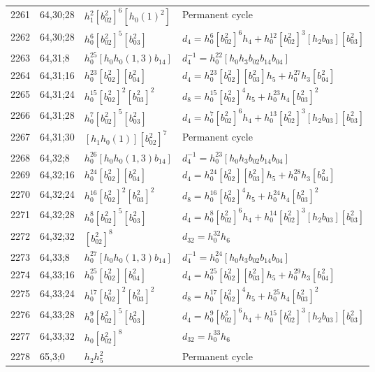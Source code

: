 \documentclass{article}
\begin{document}
\begin{longtable}{|l|l|>{\raggedright\arraybackslash}p{6cm}|>{\raggedright\arraybackslash}p{6cm}|}
\hline
2261 & 64,30;28 & $h_1^2[b_{02}^2]^6[h_0(1)^2]$ & Permanent cycle\\
2262 & 64,30;28 & $h_0^6[b_{02}^2]^5[b_{03}^2]$ &$d_{4}=h_0^6[b_{02}^2]^6h_4 + h_0^{12}[b_{02}^2]^3[h_2b_{03}][b_{03}^2]$\\
\hline
2263 & 64,31;8 & $h_0^{25}[h_0h_0(1, 3)b_{14}]$ & $d_{4}^{-1}=h_0^{22}[h_0h_3b_{02}b_{14}b_{04}]$\\
\hline
2264 & 64,31;16 & $h_0^{23}[b_{02}^2][b_{04}^2]$ &$d_{4}=h_0^{23}[b_{02}^2][b_{03}^2]h_5 + h_0^{27}h_3[b_{04}^2]$\\
\hline
2265 & 64,31;24 & $h_0^{15}[b_{02}^2]^2[b_{03}^2]^2$ &$d_{8}=h_0^{15}[b_{02}^2]^4h_5 + h_0^{23}h_4[b_{03}^2]^2$\\
\hline
2266 & 64,31;28 & $h_0^7[b_{02}^2]^5[b_{03}^2]$ &$d_{4}=h_0^7[b_{02}^2]^6h_4 + h_0^{13}[b_{02}^2]^3[h_2b_{03}][b_{03}^2]$\\
\hline
2267 & 64,31;30 & $[h_1h_0(1)][b_{02}^2]^7$ & Permanent cycle\\
\hline
2268 & 64,32;8 & $h_0^{26}[h_0h_0(1, 3)b_{14}]$ & $d_{4}^{-1}=h_0^{23}[h_0h_3b_{02}b_{14}b_{04}]$\\
\hline
2269 & 64,32;16 & $h_0^{24}[b_{02}^2][b_{04}^2]$ &$d_{4}=h_0^{24}[b_{02}^2][b_{03}^2]h_5 + h_0^{28}h_3[b_{04}^2]$\\
\hline
2270 & 64,32;24 & $h_0^{16}[b_{02}^2]^2[b_{03}^2]^2$ &$d_{8}=h_0^{16}[b_{02}^2]^4h_5 + h_0^{24}h_4[b_{03}^2]^2$\\
\hline
2271 & 64,32;28 & $h_0^8[b_{02}^2]^5[b_{03}^2]$ &$d_{4}=h_0^8[b_{02}^2]^6h_4 + h_0^{14}[b_{02}^2]^3[h_2b_{03}][b_{03}^2]$\\
\hline
2272 & 64,32;32 & $[b_{02}^2]^8$ &$d_{32}=h_0^{32}h_6$\\
\hline
2273 & 64,33;8 & $h_0^{27}[h_0h_0(1, 3)b_{14}]$ & $d_{4}^{-1}=h_0^{24}[h_0h_3b_{02}b_{14}b_{04}]$\\
\hline
2274 & 64,33;16 & $h_0^{25}[b_{02}^2][b_{04}^2]$ &$d_{4}=h_0^{25}[b_{02}^2][b_{03}^2]h_5 + h_0^{29}h_3[b_{04}^2]$\\
\hline
2275 & 64,33;24 & $h_0^{17}[b_{02}^2]^2[b_{03}^2]^2$ &$d_{8}=h_0^{17}[b_{02}^2]^4h_5 + h_0^{25}h_4[b_{03}^2]^2$\\
\hline
2276 & 64,33;28 & $h_0^9[b_{02}^2]^5[b_{03}^2]$ &$d_{4}=h_0^9[b_{02}^2]^6h_4 + h_0^{15}[b_{02}^2]^3[h_2b_{03}][b_{03}^2]$\\
\hline
2277 & 64,33;32 & $h_0[b_{02}^2]^8$ &$d_{32}=h_0^{33}h_6$\\
\hline
2278 & 65,3;0 & $h_2h_5^2$ & Permanent cycle\\

\end{longtable}
\end{document}
